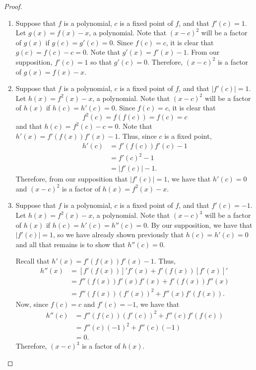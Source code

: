 \begin{proof}
  \begin{enumerate}
    \item Suppose that $f$ is a polynomial, $c$ is a fixed point of $f$, and that
      $f'(c) = 1$. Let $g(x) = f(x) - x$, a polynomial. Note that $(x-c)^2$ will be a factor
      of $g(x)$ if $g(c) = g'(c) = 0$. Since $f(c) = c$, it is clear that $g(c) = f(c) - c = 0$.
      Note that $g'(x) = f'(x) - 1.$ From our supposition, $f'(c) = 1$ so that $g'(c) = 0$.
      Therefore, $(x-c)^2$ is a factor of $g(x) = f(x) - x.$

    \item Suppose that $f$ is a polynomial, $c$ is a fixed point of $f$, and that
      $| f'(c) |= 1$. Let $h(x) = f^2(x) - x$, a polynomial. Note that $(x-c)^2$ will be a factor
      of $h(x)$ if $h(c) = h'(c) = 0$. Since $f(c) = c$, it is clear that
      $$f^2(c) = f(f(c)) = f(c) = c$$
      and that $h(c) = f^2(c) - c =0$.
      Note that $h'(x) = f'(f(x))f'(x) - 1.$ Thus, since $c$ is a fixed point,
      \begin{align*}
        h'(c) &= f'(f(c))f'(c) - 1 \\
        &= f'(c)^2 - 1 \\
        &= |f'(c)| - 1.
      \end{align*}
      Therefore, from our supposition that $|f'(c)| = 1$, we have that $h'(c) = 0$ and
      $(x-c)^2$ is a factor of $h(x) = f^2(x) - x.$

    \item Suppose that $f$ is a polynomial, $c$ is a fixed point of $f$, and that
      $f'(c) = -1$. Let $h(x) = f^2(x) - x$, a polynomial. Note that $(x-c)^3$ will
      be a factor of $h(x)$ if $h(c) = h'(c) = h''(c) = 0$. By our supposition, we have
      that $|f'(c)| = 1$, so we have already shown previously that $h(c) = h'(c) = 0$ and
      all that remains is to show that $h''(c) = 0$.

      Recall that $h'(x) = f'(f(x))f'(x) - 1$. Thus,
      \begin{align*}
        h''(x) &= \left[f'(f(x))\right]' f'(x) +  f'(f(x))\left[f'(x)\right]'  \\
        &= f''(f(x)) f'(x) f'(x) + f'(f(x))f''(x) \\
        &= f''(f(x)) \left(f'(x)\right)^2 + f''(x) f'(f(x)).
      \end{align*}
      Now, since $f(c) = c$ and $f'(c) = -1$, we have that
      \begin{align*}
        h''(c) &= f''(f(c)) \left(f'(c)\right)^2 + f''(c) f'(f(c)) \\
        &= f''(c) (-1)^2 + f''(c) (-1) \\
        &= 0.
      \end{align*}
      Therefore, $(x-c)^3$ is a factor of $h(x)$.


\end{enumerate}
\end{proof}
